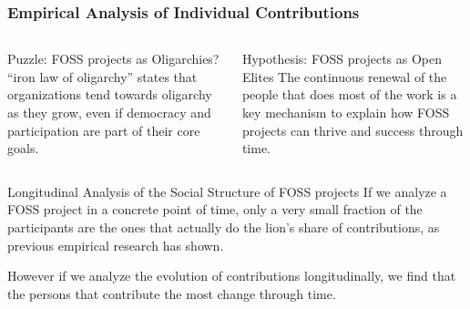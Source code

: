 \documentclass[ignorenonframetext,red,8pt,notes=hide]{beamer}
\begin{document}
\begin{frame}
\frametitle{Empirical Analysis of Individual Contributions}




\begin{columns}[c]
\begin{column}{0.5\textwidth}
\begin{block}{Puzzle: FOSS projects as Oligarchies?}
\citet{michels:1915} ``iron law of oligarchy'' states that organizations tend towards oligarchy as they grow, even if democracy and participation are part of their core goals.
\end{block}
\end{column}

\pause

\begin{column}{0.5\textwidth}
\begin{block}{Hypothesis: FOSS projects as Open Elites}
The continuous renewal of the people that does most of the work is a key mechanism to explain how FOSS projects can thrive and success through time.
\end{block}
\end{column}
\end{columns}

\pause

\vspace{0.1cm}

\begin{block}{Longitudinal Analysis of the Social Structure of FOSS projects}
If we analyze a FOSS project in a concrete point of time, only a very small fraction of the participants are the ones that actually do the lion's share of contributions, as previous empirical research has shown.

However if we analyze the evolution of contributions longitudinally, we find that the persons that contribute the most change through time.
\end{block}


\end{frame}
\end{document}
